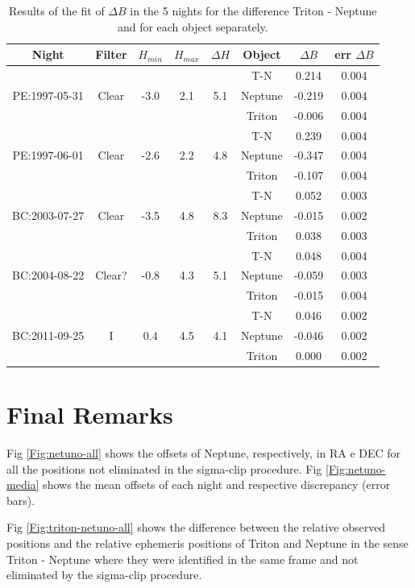 \documentclass[12pt,a4paper]{report}
\begin{document}
\begin{table}[h]
\centering
\caption{Results of the fit of $\Delta B$ in the 5 nights for the difference Triton - Neptune and for each object separately.}
\label{Tab:refraction-cor}
\begin{tabular}{|c|c|c|c|c|c|c|c|}
\hline
 Night & Filter  & $H_{min}$ & $H_{max}$ & $\Delta H$ & Object & $\Delta B$ & err $\Delta B$\\
 \hline
 & &  & & & T-N  &     0.214  &  0.004   \\
 PE:1997-05-31 &   Clear & -3.0 & 2.1 & 5.1 & Neptune &   -0.219 &  0.004  \\
 & & & & & Triton &  -0.006  &  0.004 \\
\hline
 & & & & & T-N  &  0.239  &  0.004 \\
 PE:1997-06-01 & Clear & -2.6 & 2.2 & 4.8 & Neptune &   -0.347  &  0.004 \\
 & & & & & Triton &   -0.107  &   0.004  \\
\hline
 & & & & & T-N &   0.052 &   0.003  \\
BC:2003-07-27 & Clear & -3.5 & 4.8 & 8.3 & Neptune &   -0.015  &  0.002  \\
 & & & & & Triton &    0.038  &  0.003  \\
\hline
 & & & & & T-N &   0.048  &  0.004  \\
BC:2004-08-22 & Clear? & -0.8 & 4.3 & 5.1 & Neptune &   -0.059  &   0.003  \\
 & & & & & Triton &   -0.015  &  0.004 \\
\hline
& & & & & T-N &   0.046  &  0.002  \\
BC:2011-09-25 & I & 0.4 & 4.5 & 4.1 & Neptune &   -0.046  &   0.002  \\
 & & & & & Triton &    0.000  &  0.002   \\
\hline
\end{tabular}
\end{table}

\section*{Final Remarks}

Fig \ref{Fig:netuno-all} shows the offsets of Neptune, respectively, in RA e DEC for all the positions not eliminated in the sigma-clip procedure. Fig \ref{Fig:netuno-media} shows the mean offsets of each night and respective discrepancy (error bars).

Fig \ref{Fig:triton-netuno-all} shows the difference between the relative observed positions and the relative ephemeris positions of Triton and Neptune in the sense Triton - Neptune where they were identified in the same frame and not eliminated by the sigma-clip procedure.
\end{document}
